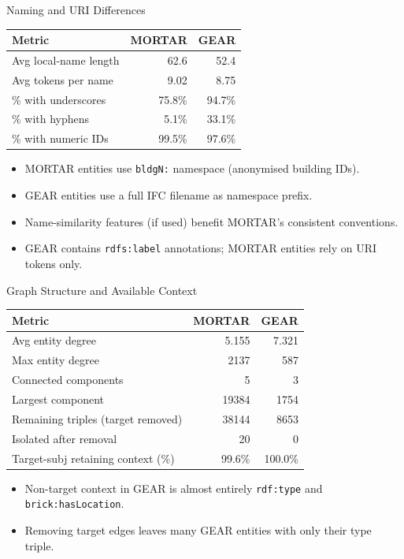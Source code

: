 \documentclass[10pt]{beamer}
\begin{document}
\begin{frame}{Naming and URI Differences}
  \begin{table}
    \centering
    \begin{tabular}{lrr}
      \toprule
      \textbf{Metric} & \textbf{MORTAR} & \textbf{GEAR} \\
      \midrule
Avg local-name length & 62.6 & 52.4 \\
Avg tokens per name & 9.02 & 8.75 \\
\% with underscores & 75.8\% & 94.7\% \\
\% with hyphens & 5.1\% & 33.1\% \\
\% with numeric IDs & 99.5\% & 97.6\% \\
      \bottomrule
    \end{tabular}
  \end{table}
  \begin{itemize}
    \item MORTAR entities use \texttt{bldgN:} namespace (anonymised building IDs).
    \item GEAR entities use a full IFC filename as namespace prefix.
    \item Name-similarity features (if used) benefit MORTAR's consistent conventions.
    \item GEAR contains \texttt{rdfs:label} annotations; MORTAR entities rely on URI tokens only.
  \end{itemize}
\end{frame}

\begin{frame}{Graph Structure and Available Context}
  \begin{table}
    \centering
    \begin{tabular}{lrr}
      \toprule
      \textbf{Metric} & \textbf{MORTAR} & \textbf{GEAR} \\
      \midrule
Avg entity degree & 5.155 & 7.321 \\
Max entity degree & 2137 & 587 \\
Connected components & 5 & 3 \\
Largest component & 19384 & 1754 \\
Remaining triples (target removed) & 38144 & 8653 \\
Isolated after removal & 20 & 0 \\
Target-subj retaining context (\%) & 99.6\% & 100.0\% \\
      \bottomrule
    \end{tabular}
  \end{table}
  \begin{itemize}
    \item Non-target context in GEAR is almost entirely \texttt{rdf:type} and \texttt{brick:hasLocation}.
    \item Removing target edges leaves many GEAR entities with only their type triple.
  \end{itemize}
\end{frame}
\end{document}
